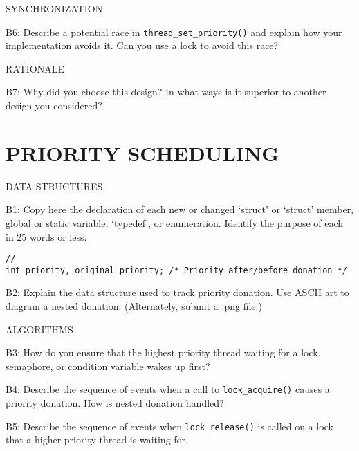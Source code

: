 \begin{aspect}{SYNCHRONIZATION}

	\begin{qc}
		B6: Describe a potential race in \lstinline{thread_set_priority()} and explain how your implementation avoids it.  Can you use a lock to avoid this race?
	\end{qc}

\end{aspect}

\begin{aspect}{RATIONALE}
	\begin{qc}
		B7: Why did you choose this design?  In what ways is it superior to another design you considered?
	\end{qc}

\end{aspect}\section{PRIORITY SCHEDULING}
\begin{aspect}{DATA STRUCTURES}
	\begin{qc}
		B1: Copy here the declaration of each new or changed `struct' or `struct' member, global or static variable, `typedef', or enumeration.  Identify the purpose of each in 25 words or less.
	\end{qc}

	\begin{lstlisting}
//
int priority, original_priority; /* Priority after/before donation */
\end{lstlisting}


	\begin{qc}
		B2: Explain the data structure used to track priority donation.
		Use ASCII art to diagram a nested donation.  (Alternately, submit a
		.png file.)
	\end{qc}
\end{aspect}

\begin{aspect}{ALGORITHMS}
	\begin{qc}
		B3: How do you ensure that the highest priority thread waiting for a lock, semaphore, or condition variable wakes up first?
	\end{qc}

	\begin{qc}
		B4: Describe the sequence of events when a call to \lstinline{lock_acquire()} causes a priority donation.  How is nested donation handled?
	\end{qc}

	\begin{qc}
		B5: Describe the sequence of events when \lstinline{lock_release()} is called on a lock that a higher-priority thread is waiting for.
	\end{qc}

\end{aspect}


